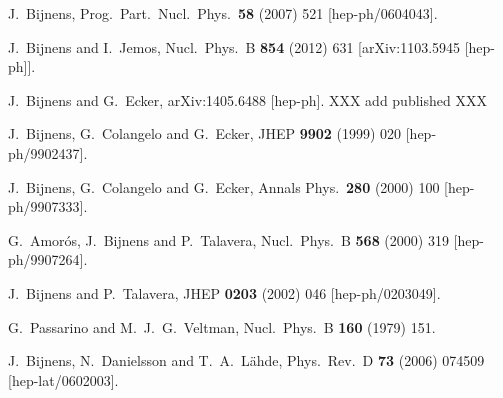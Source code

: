 \documentclass[12pt,a4paper]{article}
\begin{document}
\begin{thebibliography}{99}
  J.~Bijnens,
  Prog.\ Part.\ Nucl.\ Phys.\  {\bf 58} (2007) 521
  [hep-ph/0604043].

  J.~Bijnens and I.~Jemos,
  Nucl.\ Phys.\ B {\bf 854} (2012) 631
  [arXiv:1103.5945 [hep-ph]].

  J.~Bijnens and G.~Ecker,
  arXiv:1405.6488 [hep-ph].
  XXX add published XXX

  J.~Bijnens, G.~Colangelo and G.~Ecker,
  JHEP {\bf 9902} (1999) 020
  [hep-ph/9902437].

  J.~Bijnens, G.~Colangelo and G.~Ecker,
  Annals Phys.\  {\bf 280} (2000) 100
  [hep-ph/9907333].

  G.~Amor\'os, J.~Bijnens and P.~Talavera,
  Nucl.\ Phys.\ B {\bf 568} (2000) 319
  [hep-ph/9907264].

  J.~Bijnens and P.~Talavera,
  JHEP {\bf 0203} (2002) 046
  [hep-ph/0203049].

  G.~Passarino and M.~J.~G.~Veltman,
  Nucl.\ Phys.\ B {\bf 160} (1979) 151.

  J.~Bijnens, N.~Danielsson and T.~A.~L\"ahde,
  Phys.\ Rev.\ D {\bf 73} (2006) 074509
  [hep-lat/0602003].


\end{thebibliography}
\end{document}
